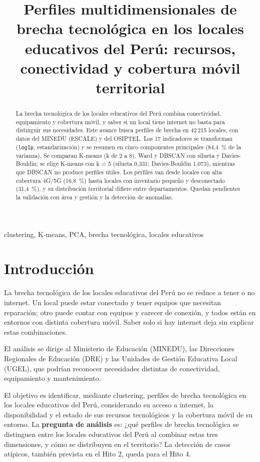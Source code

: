 \documentclass[conference]{IEEEtran}
\title{Perfiles multidimensionales de brecha tecnológica en los locales educativos del Perú: recursos, conectividad y cobertura móvil territorial}
\author{
\IEEEauthorblockN{Francisco Luis Delgado Santana, Nicole Rashel Pando Cabezas, Brayan Anderson Rua Pomahuacre}
\IEEEauthorblockA{Grupo: Mineros \\
Curso: Data Mining \\
Universidad del Pacífico \\
Docente: Soledad Espezúa Llerena}
}
\begin{document}
\maketitle

\begin{abstract}
La brecha tecnológica de los locales educativos del Perú combina conectividad, equipamiento y cobertura móvil, y saber si un local tiene internet no basta para distinguir sus necesidades. Este avance busca perfiles de brecha en 42\,215 locales, con datos del MINEDU (ESCALE) y del OSIPTEL. Los 17 indicadores se transforman (\texttt{log1p}, estandarización) y se resumen en cinco componentes principales (84,4~\% de la varianza). Se comparan K-means (k de 2 a 8), Ward y DBSCAN con silueta y Davies-Bouldin; se elige K-means con k = 5 (silueta 0,331; Davies-Bouldin 1,073), mientras que DBSCAN no produce perfiles útiles. Los perfiles van desde locales con alta cobertura 4G/5G (16,8~\%) hasta locales con inventario pequeño y desconectado (31,4~\%), y su distribución territorial difiere entre departamentos. Quedan pendientes la validación con área y gestión y la detección de anomalías.
\end{abstract}

\begin{IEEEkeywords}
clustering, K-means, PCA, brecha tecnológica, locales educativos
\end{IEEEkeywords}

\section{Introducción}
La brecha tecnológica de los locales educativos del Perú no se reduce a tener o no internet. Un local puede estar conectado y tener equipos que necesitan reparación; otro puede contar con equipos y carecer de conexión, y todos están en entornos con distinta cobertura móvil. Saber solo si hay internet deja sin explicar estas combinaciones.

El análisis se dirige al Ministerio de Educación (MINEDU), las Direcciones Regionales de Educación (DRE) y las Unidades de Gestión Educativa Local (UGEL), que podrían reconocer necesidades distintas de conectividad, equipamiento y mantenimiento.

El objetivo es identificar, mediante clustering, perfiles de brecha tecnológica en los locales educativos del Perú, considerando su acceso a internet, la disponibilidad y el estado de sus recursos tecnológicos y la cobertura móvil de su entorno. La \textbf{pregunta de análisis} es: ¿qué perfiles de brecha tecnológica se distinguen entre los locales educativos del Perú al combinar estas tres dimensiones, y cómo se distribuyen en el territorio? La detección de casos atípicos, también prevista en el Hito 2, queda para el Hito 4.
\end{document}

